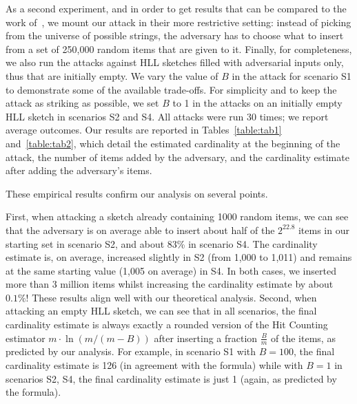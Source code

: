 \documentclass{article}
\begin{document}
As a second experiment, and in order to get results that can be compared to the work of~\cite{hllvuln}, we mount our attack in their more restrictive setting: instead of picking from the universe of possible strings, the adversary has to choose what to insert from a set of 250,000 random items that are given to it. Finally, for completeness, we also run the attacks against HLL sketches filled with adversarial inputs only, thus that are initially empty. We vary the value of $B$ in the attack for scenario S1 to demonstrate some of the available trade-offs. For simplicity and to keep the attack as striking as possible, we set $B$ to 1 in the attacks on an initially empty HLL sketch in scenarios S2 and S4. All attacks were run 30 times; we report average outcomes. Our results are reported in Tables~\ref{table:tab1} and~\ref{table:tab2}, which detail the estimated cardinality at the beginning of the attack, the number of items added by the adversary, and the cardinality estimate after adding the adversary's items.

These empirical results confirm our analysis on several points.

First, when attacking a sketch already containing 1000 random items, we can see that the adversary is on average able to insert about half of the $2^{22.8}$ items in our starting set in scenario S2, and about 83\% in scenario S4. The cardinality estimate is, on average, increased slightly in S2 (from 1,000 to 1,011) and remains at the same starting value (1,005 on average) in S4. In both cases, we inserted more than 3 million items whilst increasing the cardinality estimate by about $0.1\%$!  These results align well with our theoretical analysis.  
Second, when attacking an empty HLL sketch, we can see that in all scenarios, the final cardinality estimate is always exactly a rounded version of the Hit Counting estimator $m \cdot \ln (m/(m-B))$ after inserting a fraction $\frac{B}{m}$ of the items, as predicted by our analysis. For example, in scenario S1 with $B=100$, the final cardinality estimate is 126 (in agreement with the formula) while with $B=1$ in scenarios S2, S4, the final cardinality estimate is just 1 (again, as predicted by the formula).
\end{document}

